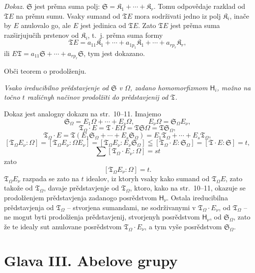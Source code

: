 \documentclass[11pt]{article}
\begin{document}
\emph{Dokaz.} \(\mathfrak S\) jest prěma suma polj: \(\mathfrak S=\mathfrak K_1+\cdots+\mathfrak K_r\). Tomu odpovědaje razklad od \(\mathfrak T E\) na prěmu sumu. Vsaky sumand od \(\mathfrak T E\) mora sodrživati jedno iz polj \(\mathfrak K_i\), inače by \(E\) anulovalo go, ale \(E\) jest jedinica od \(\mathfrak T E\). Zato \(\mathfrak T E\) jest prěma suma razširjujučih prstenov od \(\mathfrak K_i\), t.~j. prěma suma formy
\[
\mathfrak T E=a_{11}\mathfrak K_1+\cdots+a_{1p_1}\mathfrak K_1+\cdots+a_{rp_r}\mathfrak K_r,
\]
ili \(E\mathfrak T=a_{11}\mathfrak S+\cdots+a_{rp_r}\mathfrak S\), tym jest dokazano.

\begin{center}
Obči teorem o prodolženju.
\end{center}

\emph{Vsako ireducibilno prědstavjenje od \(\mathfrak S\) v \(\Omega\), zadano homomorfizmom \(\mathsf{H}_i\), možno na točno \(t\) različnyh načinov prodolžiti do prědstavjenij od \(\mathfrak T\).}

Dokaz jest analogny dokazu na str.~10--11. Imajemo
\[
\mathfrak S_\Omega=E_1\Omega+\cdots+E_s\Omega,\qquad
E_\nu\Omega=\mathfrak S_\Omega E_\nu,
\]
\[
\mathfrak T_\Omega\cdot E=\mathfrak T\cdot E\Omega
=\mathfrak T\mathfrak S\Omega=\mathfrak T\mathfrak S_\Omega,
\]
\[
\mathfrak T_\Omega\cdot E
=\mathfrak T(E_1\mathfrak S_\Omega+\cdots+E_s\mathfrak S_\Omega)
=E_1\mathfrak T_\Omega+\cdots+E_s\mathfrak T_\Omega,
\]
\[
[\mathfrak T_\Omega E_\nu:\Omega]
=[\mathfrak T_\Omega E_\nu:\Omega E_\nu]
=[\mathfrak T_\Omega E_\nu:E_\nu\mathfrak S_\Omega]
\leqq[\mathfrak T_\Omega\cdot E:\mathfrak S_\Omega]
=[\mathfrak T\cdot E:\mathfrak S]=t,
\]
\[
\sum[\mathfrak T_\Omega\cdot E_\nu:\Omega]=st
\]
zato
\[
[\mathfrak T_\Omega E_\nu:\Omega]=t.
\]
\(\mathfrak T_\Omega E_\nu\) razpada se zato na \(t\) idealov, iz ktoryh vsaky kako sumand od \(\mathfrak T_\Omega E\), zato takože od \(\mathfrak T_\Omega\), davaje prědstavjenje od \(\mathfrak T_\Omega\), ktoro, kako na str.~10--11, okazuje se prodolženjem prědstavjenja zadanogo posrědstvom \(\mathsf{H}_\nu\). Ostala ireducibilna prědstavjenja od \(\mathfrak T_\Omega\) -- stvorjena sumandami, ne sodrživanymi v \(\mathfrak T_\Omega\cdot E_\nu\), od \(\mathfrak T_\Omega\) -- ne mogut byti prodolženja prědstavjenij, stvorjenyh posrědstvom \(\mathsf{H}_\nu\), od \(\mathfrak S_\Omega\), zato že te idealy sut anulovane posrědstvom \(\mathfrak T_\Omega\cdot E_\nu\), a tym vyše posrědstvom \(\mathfrak S_\Omega\).

\section*{Glava III. Abelove grupy}\label{kapitel-iii.-abelsche-gruppen}
\end{document}
